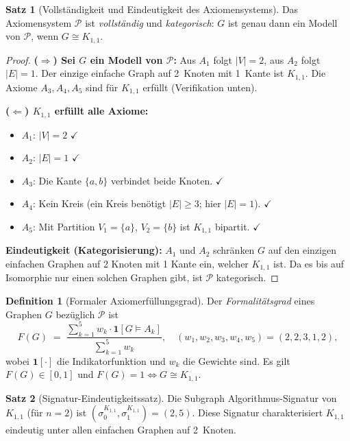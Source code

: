 ﻿\documentclass[a4paper,12pt]{article}
\theoremstyle{definition}
\newtheorem{definition}{Definition}
\newtheorem{satz}{Satz}
\begin{document}
\begin{satz}[Vollständigkeit und Eindeutigkeit des Axiomensystems]
	\label{satz:axiome}
	Das Axiomensystem $\mathcal{P}$ ist \emph{vollständig} und \emph{kategorisch}:
	$G$ ist genau dann ein Modell von $\mathcal{P}$, wenn $G \cong K_{1,1}$.
\end{satz}

\begin{proof}
	\textbf{($\Rightarrow$) Sei $G$ ein Modell von $\mathcal{P}$:}
	Aus $A_1$ folgt $|V| = 2$, aus $A_2$ folgt $|E| = 1$.
	Der einzige einfache Graph auf 2~Knoten mit 1~Kante ist $K_{1,1}$.
	Die Axiome $A_3, A_4, A_5$ sind für $K_{1,1}$ erfüllt (Verifikation unten).
	
	\textbf{($\Leftarrow$) $K_{1,1}$ erfüllt alle Axiome:}
	\begin{itemize}
		\item $A_1$: $|V| = 2$ $\checkmark$
		\item $A_2$: $|E| = 1$ $\checkmark$
		\item $A_3$: Die Kante $\{a,b\}$ verbindet beide Knoten. $\checkmark$
		\item $A_4$: Kein Kreis (ein Kreis benötigt $|E| \geq 3$; hier $|E|=1$). $\checkmark$
		\item $A_5$: Mit Partition $V_1 = \{a\}$, $V_2 = \{b\}$ ist $K_{1,1}$ bipartit. $\checkmark$
	\end{itemize}
	
	\textbf{Eindeutigkeit (Kategorisierung):} $A_1$ und $A_2$ schränken $G$
	auf den einzigen einfachen Graphen auf 2 Knoten mit 1 Kante ein, welcher $K_{1,1}$
	ist. Da es bis auf Isomorphie nur einen solchen Graphen gibt, ist $\mathcal{P}$
	kategorisch. \qedhere
\end{proof}

\begin{definition}[Formaler Axiomerfüllungsgrad]
	\label{def:formal}
	Der \emph{Formalitätsgrad} eines Graphen $G$ bezüglich $\mathcal{P}$ ist
	\[
		F(G) \;=\; \frac{\sum_{k=1}^5 w_k \cdot \mathbf{1}[G \models A_k]}{\sum_{k=1}^5 w_k},
		\quad (w_1,w_2,w_3,w_4,w_5) = (2,2,3,1,2),
	\]
	wobei $\mathbf{1}[\cdot]$ die Indikatorfunktion und $w_k$ die Gewichte sind.
	Es gilt $F(G) \in [0,1]$ und $F(G) = 1 \iff G \cong K_{1,1}$.
\end{definition}

\begin{satz}[Signatur-Eindeutigkeitssatz]
	\label{satz:signatur}
	Die Subgraph Algorithmus-Signatur von $K_{1,1}$ (für $n = 2$) ist
	$(\sigma_0^{K_{1,1}}, \sigma_1^{K_{1,1}}) = (2, 5)$.
	Diese Signatur charakterisiert $K_{1,1}$ eindeutig unter allen einfachen
	Graphen auf 2~Knoten.
\end{satz}
\end{document}
